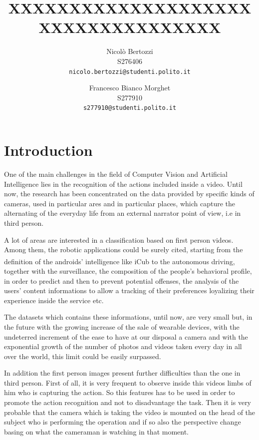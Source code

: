 \documentclass[10pt,twocolumn,letterpaper]{article}
\begin{document}
\title{XXXXXXXXXXXXXXXXXXXXXXXXXXXXXXXXXXX}

\author{Nicolò Bertozzi\\
S276406\\
{\tt\small nicolo.bertozzi@studenti.polito.it}
\and
Francesco Bianco Morghet\\
S277910\\
{\tt\small s277910@studenti.polito.it}
}

\maketitle


\begin{abstract}
\end{abstract}


\section{Introduction}

One of the main challenges in the field of Computer Vision and Artificial Intelligence lies in the recognition of the actions included inside a video. Until now, the research has been concentrated on the data provided by specific kinds of cameras, used in particular ares and in particular places, which capture the alternating of the everyday life from an external narrator point of view, i.e in third person.

A lot of areas are interested in a classification based on first person videos. Among them, the robotic applications could be surely cited, starting from the definition of the androids’ intelligence like iCub\textsuperscript{\textcopyright} to the autonomous driving, together with the surveillance, the composition of the people’s behavioral profile, in order to predict and then to prevent potential offenses, the analysis of the users’ content informations to allow a tracking of their preferences loyalizing their experience inside the service etc.

The datasets which contains these informations, until now, are very small but, in the future with the growing increase of the sale of wearable devices, with the undeterred increment of the ease to have at our disposal a camera and with the exponential growth of the number of photos and videos taken every day in all over the world, this limit could be easily surpassed. 

In addition the first person images present further difficulties than the one in third person. First of all, it is very frequent to observe inside this videos limbs of him who is capturing the action. So this features has to be used in order to promote the action recognition and not to disadvantage the task. Then it is very probable that the camera which is taking the video is mounted on the head of the subject who is performing the operation and if so also the perspective change basing on what the cameraman is watching in that moment.
\end{document}

